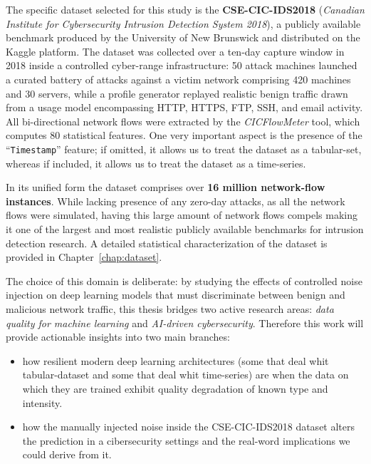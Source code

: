 \documentclass[../main.tex]{subfiles}
\begin{document}
The specific dataset selected for this study is the \textbf{CSE-CIC-IDS2018}\supercite{ids2018} (\emph{Canadian Institute for Cybersecurity Intrusion Detection System 2018}), a publicly available benchmark produced by the University of New Brunswick and distributed on the Kaggle platform.
The dataset was collected over a ten-day capture window in 2018 inside a controlled cyber-range infrastructure: 50 attack machines launched a curated battery of attacks against a victim network comprising 420 machines and 30 servers, while a profile generator replayed realistic benign traffic drawn from a usage model encompassing HTTP, HTTPS, FTP, SSH, and email activity.
All bi-directional network flows were extracted by the \textit{CICFlowMeter} tool, which computes 80 statistical features. One very important aspect is the presence of the “\texttt{Timestamp}” feature; if omitted, it allows us to treat the dataset as a tabular-set, whereas if included, it allows us to treat the dataset as a time-series.

In its unified form the dataset comprises over \textbf{16 million network-flow instances}. While lacking presence of any zero-day attacks, as all the network flows were simulated, having this large amount of network flows compels making it one of the largest and most realistic publicly available benchmarks for intrusion detection research.  A detailed statistical characterization of the dataset  is provided in Chapter~\ref{chap:dataset}.

The choice of this domain is deliberate: by studying the effects of controlled noise injection on deep learning models that must discriminate between benign and malicious network traffic, this thesis bridges two active research areas: \emph{data quality for machine learning} and \emph{AI-driven cybersecurity}. Therefore this work will provide actionable insights into two main branches:
\begin{itemize}
    \item how resilient modern deep learning architectures (some that deal whit tabular-dataset and some that deal whit time-series) are when the data on which they are trained exhibit quality degradation of known type and intensity.
    \item how the manually injected noise inside the CSE-CIC-IDS2018 dataset alters the prediction in a cibersecurity settings and the real-word implications we could derive from it. 
\end{itemize}


\newpage
\end{document}
